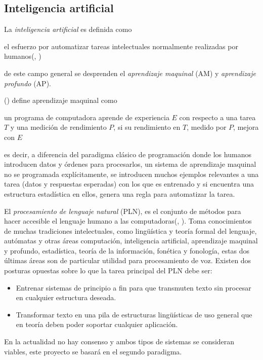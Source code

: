 \subsection {Inteligencia artificial}\label{subsec:intela}
La \emph{inteligencia artificial} es definida como
\begin{displayquote}
el esfuerzo por automatizar tareas intelectuales normalmente realizadas por humanos(\citeauthor{cho18}, \citeyear{cho18})
\end{displayquote}
de este campo general se desprenden el \emph{aprendizaje maquinal} (AM) y \emph{aprendizaje profundo} (AP).

\citeauthor{mich19} (\citeyear{mich19}) define aprendizaje maquinal como\begin{displayquote}
un programa de computadora aprende de experiencia $E$ con respecto a una tarea $T$ y una medición de rendimiento $P$, si su rendimiento en $T$, medido por $P$, mejora con $E$
\end{displayquote}
es decir, a diferencia del paradigma clásico de programación donde los humanos introducen datos y órdenes para procesarlos, un sistema de aprendizaje maquinal no se programada explícitamente, se introducen muchos ejemplos relevantes a una tarea (datos y respuestas esperadas) con los que es entrenado y si encuentra una estructura estadística en ellos, genera una regla para automatizar la tarea.

El \emph{procesamiento de lenguaje natural} (PLN), es el conjunto de métodos para hacer accesible el lenguaje humano a las computadoras(\citeauthor{eise19}, \citeyear{eise19}). Toma conocimientos de muchas tradiciones intelectuales, como lingüística y teoría formal del lenguaje, autómatas y otras áreas computación, inteligencia artificial, aprendizaje maquinal y profundo, estadística, teoría de la información, fonética y fonología, estas dos últimas áreas son de particular utilidad para procesamiento de voz. Existen dos posturas opuestas sobre lo que la tarea principal del PLN debe ser:
\begin{itemize}
	\item Entrenar sistemas de principio a fin para que transmuten texto sin procesar en cualquier estructura deseada.
	\item Transformar texto en una pila de estructuras lingüísticas de uso general que en teoría deben poder soportar cualquier aplicación.
\end{itemize}
En la actualidad no hay consenso y ambos tipos de sistemas se consideran viables, este proyecto se basará en el segundo paradigma. 

